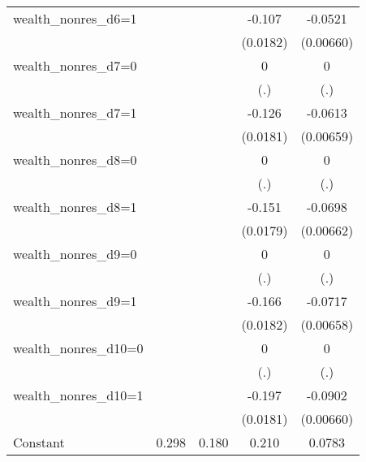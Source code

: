 \begin{table}[htbp]
\begin{tabular}{l*{4}{c}}
wealth\_nonres\_d6=1&                  &                  &   -0.107\sym{***}&  -0.0521\sym{***}\\
                &                  &                  & (0.0182)         &(0.00660)         \\
wealth\_nonres\_d7=0&                  &                  &        0         &        0         \\
                &                  &                  &      (.)         &      (.)         \\
wealth\_nonres\_d7=1&                  &                  &   -0.126\sym{***}&  -0.0613\sym{***}\\
                &                  &                  & (0.0181)         &(0.00659)         \\
wealth\_nonres\_d8=0&                  &                  &        0         &        0         \\
                &                  &                  &      (.)         &      (.)         \\
wealth\_nonres\_d8=1&                  &                  &   -0.151\sym{***}&  -0.0698\sym{***}\\
                &                  &                  & (0.0179)         &(0.00662)         \\
wealth\_nonres\_d9=0&                  &                  &        0         &        0         \\
                &                  &                  &      (.)         &      (.)         \\
wealth\_nonres\_d9=1&                  &                  &   -0.166\sym{***}&  -0.0717\sym{***}\\
                &                  &                  & (0.0182)         &(0.00658)         \\
wealth\_nonres\_d10=0&                  &                  &        0         &        0         \\
                &                  &                  &      (.)         &      (.)         \\
wealth\_nonres\_d10=1&                  &                  &   -0.197\sym{***}&  -0.0902\sym{***}\\
                &                  &                  & (0.0181)         &(0.00660)         \\
Constant        &    0.298\sym{***}&    0.180\sym{***}&    0.210\sym{**} &   0.0783         \\

\end{tabular}
\end{table}
